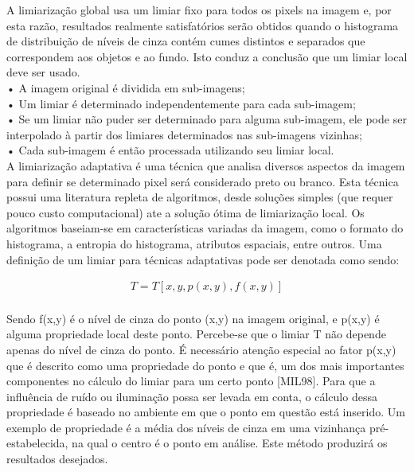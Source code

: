 \documentclass[letterpaper, 10 pt, conference]{ieeeconf}  %
\begin{document}
A limiarização global usa um limiar fixo para todos os pixels na imagem e, por esta razão, resultados realmente satisfatórios serão obtidos quando o histograma de distribuição de níveis de cinza contém cumes distintos e separados que correspondem aos objetos e ao fundo. Isto conduz a conclusão que um limiar local deve ser usado.\\

• A imagem original é dividida em sub-imagens;\\

• Um limiar é determinado independentemente para cada sub-imagem;\\

• Se um limiar não puder ser determinado para alguma sub-imagem, ele pode ser interpolado à partir dos limiares determinados nas sub-imagens vizinhas;\\

• Cada sub-imagem é então processada utilizando seu limiar local.\\

A limiarização adaptativa é uma técnica que analisa diversos aspectos da imagem para definir se determinado pixel será considerado preto ou branco. Esta técnica possui uma literatura repleta de algoritmos, desde soluções simples (que requer pouco custo computacional) ate a solução ótima de limiarização local. Os algoritmos baseiam-se em características variadas da imagem, como o formato do histograma, a entropia do histograma, atributos espaciais, entre outros. Uma definição de um limiar para técnicas adaptativas pode ser denotada
como sendo:

\begin{align}
T=T[x,y,p(x,y),f(x,y)]
\end{align}
\\Sendo f(x,y) é o nível de cinza do ponto (x,y) na imagem original, e p(x,y) é
alguma propriedade local deste ponto. Percebe-se que o limiar T não depende
apenas do nível de cinza do ponto. É necessário atenção especial ao fator p(x,y) que
é descrito como uma propriedade do ponto e que é, um dos mais importantes
componentes no cálculo do limiar para um certo ponto [MIL98]. Para que a influência
de ruído ou iluminação possa ser levada em conta, o cálculo dessa propriedade é
baseado no ambiente em que o ponto em questão está inserido. Um exemplo de
propriedade é a média dos níveis de cinza em uma vizinhança pré-estabelecida, na
qual o centro é o ponto em análise. Este método produzirá os resultados desejados.

\end{document}
